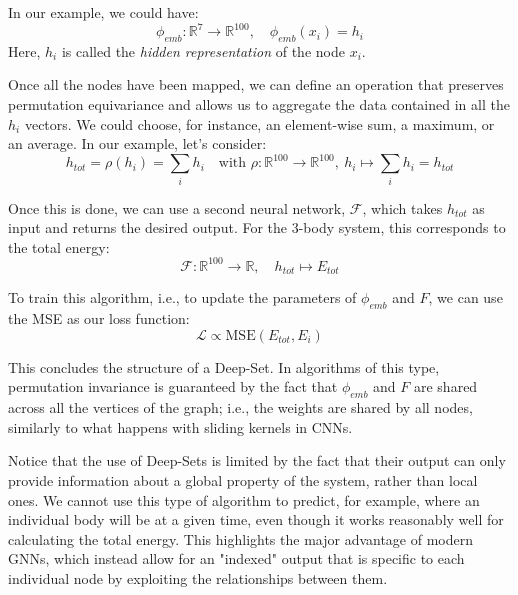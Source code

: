 In our example, we could have:
\begin{equation*}
    \phi_{emb}: \mathbb{R}^7 \longrightarrow \mathbb{R}^{100}, \quad \phi_{emb}(x_i) = h_i
\end{equation*}
Here, $h_i$ is called the \textit{hidden representation} of the node $x_i$.

Once all the nodes have been mapped, we can define an operation that preserves permutation equivariance and allows us to aggregate the data contained in all the $h_i$ vectors. We could choose, for instance, an element-wise sum, a maximum, or an average. In our example, let's consider:
\begin{equation*}
    h_{tot} = \rho(h_i) = \sum_i h_i \quad \text{with } \rho: \mathbb{R}^{100} \rightarrow \mathbb{R}^{100}, \ h_i \mapsto \sum_i h_i = h_{tot}
\end{equation*}

Once this is done, we can use a second neural network, $\mathcal{F}$, which takes $h_{tot}$ as input and returns the desired output. For the 3-body system, this corresponds to the total energy:
\begin{equation*}
    \mathcal{F}: \mathbb{R}^{100} \rightarrow \mathbb{R}, \quad h_{tot} \mapsto E_{tot}
\end{equation*}

To train this algorithm, i.e., to update the parameters of $\phi_{emb}$ and $F$, we can use the MSE as our loss function:
\begin{equation*}
    \mathcal{L} \propto \text{MSE}(E_{tot}, E_i)
\end{equation*}

This concludes the structure of a Deep-Set. In algorithms of this type, permutation invariance is guaranteed by the fact that $\phi_{emb}$ and $F$ are shared across all the vertices of the graph; i.e., the weights are shared by all nodes, similarly to what happens with sliding kernels in CNNs.

Notice that the use of Deep-Sets is limited by the fact that their output can only provide information about a global property of the system, rather than local ones. We cannot use this type of algorithm to predict, for example, where an individual body will be at a given time, even though it works reasonably well for calculating the total energy. This highlights the major advantage of modern GNNs, which instead allow for an "indexed" output that is specific to each individual node by exploiting the relationships between them.

